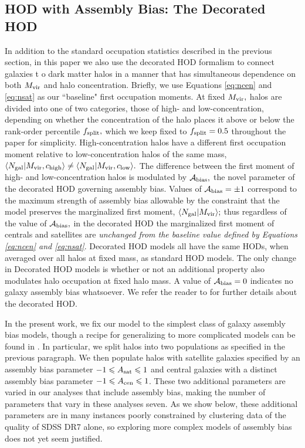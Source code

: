 \documentclass[usenatbib,usegraphicx,letterpaper]{mn2e}
\newcommand{\mvir}{M_{\rm vir}}
\newcommand{\ngal}{N_{\rm gal}}
\newcommand{\abias}{\mathcal{A}_{\rm bias}}
\begin{document}
\subsection{HOD with Assembly Bias: The Decorated HOD}
\label{subsection:decorated}

In addition to the standard occupation statistics described in the
previous section, in this paper we also use the decorated HOD
formalism to connect galaxies t o dark matter halos in a manner that
has simultaneous dependence on both $\mvir$ and halo concentration.
Briefly, we use Equations \ref{eq:ncen} and \ref{eq:nsat} as our
``baseline" first occupation moments.  At fixed $\mvir,$ halos are
divided into one of two categories, those of high- and
low-concentration, depending on whether the concentration of the halo
places it above or below the rank-order percentile $f_{\rm split},$
which we keep fixed to $f_{\rm split}=0.5$ throughout the paper for
simplicity.  High-concentration halos have a different first
occupation moment relative to low-concentration halos of the same
mass, $\langle\ngal|\mvir, c_{\rm high}\rangle \neq
\langle\ngal|\mvir, c_{\rm low}\rangle.$ The difference between the
first moment of high- and low-concentration halos is modulated by
$\abias,$ the novel parameter of the decorated HOD governing assembly
bias. Values of $\abias=\pm1$ correspond to the maximum strength of
assembly bias allowable by the constraint that the model preserves the
marginalized first moment, $\langle\ngal|\mvir\rangle;$ thus
regardless of the value of $\abias,$ in the decorated HOD the
marginalized first moment of centrals and satellites are {\em
  unchanged from the baseline value defined by Equations \ref{eq:ncen}
  and \ref{eq:nsat}}.  Decorated HOD models all have the same HODs,
when averaged over all halos at fixed mass, as standard HOD
models. The only change in Decorated HOD models is whether or not an
additional property also modulates halo occupation at fixed halo
mass. A value of $\abias = 0$ indicates no galaxy assembly bias
whatsoever. We refer the reader to \citet{hearin_etal16} for further
details about the decorated HOD.

In the present work, we fix our model to the simplest class of galaxy
assembly bias models, though a recipe for generalizing to more
complicated models can be found in \citet{hearin_etal16}. In
particular, we split halos into two populations as specified in the
previous paragraph. We then populate halos with satellite galaxies
specified by an assembly bias parameter $-1 \le A_{\rm sat} \le 1$ and
central galaxies with a distinct assembly bias parameter $-1 \le
A_{\rm cen} \le 1$. These two additional parameters are varied in our
analyses that include assembly bias, making the number of parameters
that vary in these analyses seven. As we show below, these additional
parameters are in many instances poorly constrained by clustering data
of the quality of SDSS DR7 alone, so exploring more complex models of
assembly bias does not yet seem justified.
\end{document}
